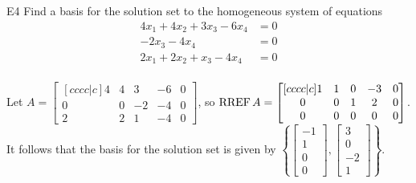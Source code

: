 \documentclass{sbgLAexam}
\begin{document}
\begin{problem}{E4}
Find a basis for the solution set to the homogeneous system of equations
\begin{align*}
4x_1+4x_2+3x_3-6x_4 &= 0 \\
-2x_3-4x_4 &= 0 \\
2x_1+2x_2+x_3-4x_4 &= 0 \\
\end{align*}
\end{problem}
\begin{solution}
Let \(A =
  \begin{bmatrix}[cccc|c]
    4 & 4 & 3 & -6 & 0 \\
    0 & 0 & -2 & -4 & 0 \\
    2 & 2 & 1 & -4 & 0
  \end{bmatrix}
\), so \(\operatorname{RREF} A =
  \begin{bmatrix}[cccc|c]
    1 & 1 & 0 & -3 & 0 \\
    0 & 0 & 1 & 2 & 0 \\
    0 & 0 & 0 & 0 & 0
  \end{bmatrix}
\).
It follows that the basis for the solution set is given by \(\left\{
  \begin{bmatrix}
    -1 \\
    1 \\
    0 \\
    0
  \end{bmatrix},
  \begin{bmatrix}
    3 \\
    0 \\
    -2 \\
    1
  \end{bmatrix}
\right\}\).
\end{solution}
\end{document}
